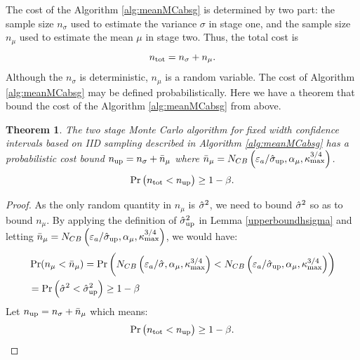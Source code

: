 \documentclass{iitthesis}
\newtheorem{theorem}{Theorem}[section]
\theoremstyle{definition}
\begin{document}
\label{sec:meanMCabsgcost}

The cost of the Algorithm \ref{alg:meanMCabsg} is determined by two part: the sample size $n_{\sigma}$ used to estimate the variance $\sigma$ in stage one, and the sample size $n_\mu$ used to estimate the mean $\mu$ in stage two. Thus, the total cost is 
$$n_{\rm tot} = n_\sigma+n_\mu.$$
Although the $n_\sigma$ is deterministic, $n_\mu$ is a random variable. The cost of Algorithm \ref{alg:meanMCabsg} may be defined probabilistically. Here we have a theorem that bound the cost of the Algorithm \ref{alg:meanMCabsg} from above.

\begin{theorem}
The two stage Monte Carlo algorithm for fixed width confidence intervals based on IID sampling described in Algorithm \ref{alg:meanMCabsg} has a probabilistic cost bound $n_{\operatorname{up}} =n_\sigma+\bar{n}_{\mu}$ where $\bar{n}_{\mu}=N_{CB}\left(\varepsilon_a/\hat{\sigma}_{\operatorname{up}},\alpha_\mu, \kappa_{\max}^{3/4}\right)$.
\begin{align}
\Pr \left(n_{\operatorname{tot}} < n_{\operatorname{up}}\right)  \geq 1-\beta.
\end{align}
\end{theorem}

\begin{proof}
As the only random quantity in $n_\mu$ is $\hat{\sigma}^2$, we need to bound $\hat{\sigma}^2$ so as  to bound $n_{\mu}$.
 By applying the definition of $\hat{\sigma}_{\operatorname{up}}^2$ in Lemma \ref{upperboundhsigma} and letting $\bar{n}_{\mu} = N_{CB}\left(\varepsilon_a/\hat{\sigma}_{\operatorname{up}},\alpha_\mu, \kappa_{\max}^{3/4}\right)$, we would have:
\begin{align}
& \Pr(n_{\mu} < \bar{n}_{\mu})  = \Pr\left (N_{CB}\left(\varepsilon_a/\hat{\sigma},\alpha_\mu, \kappa_{\max}^{3/4}\right) < N_{CB}\left(\varepsilon_a/\hat{\sigma}_{\operatorname{up}},\alpha_\mu, \kappa_{\max}^{3/4}\right) \right)\\&
 = \Pr \left(\hat{\sigma}^2 < \hat{\sigma}_{\operatorname{up}}^2 \right) \geq 1-\beta
\end{align}
Let $n_{\operatorname{up}} =n_\sigma+\bar{n}_{\mu} $
which means:
\begin{align}
\Pr \left(n_{\operatorname{tot}} < n_{\operatorname{up}}\right)  \geq 1-\beta.
\end{align}
\end{proof}
\label{sec:numericalintegrationviaMC}
\end{document}
